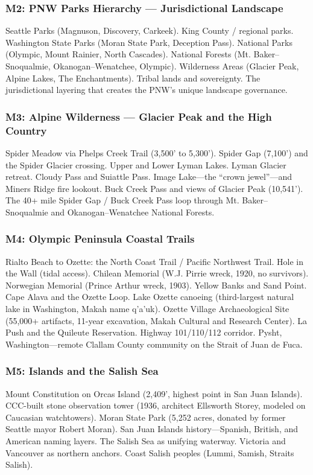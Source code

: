 \documentclass[11pt,letterpaper]{article}
\begin{document}
\subsubsection{M2: PNW Parks Hierarchy — Jurisdictional Landscape}
Seattle Parks (Magnuson, Discovery, Carkeek). King County / regional parks. Washington State Parks (Moran State Park, Deception Pass). National Parks (Olympic, Mount Rainier, North Cascades). National Forests (Mt. Baker--Snoqualmie, Okanogan--Wenatchee, Olympic). Wilderness Areas (Glacier Peak, Alpine Lakes, The Enchantments). Tribal lands and sovereignty. The jurisdictional layering that creates the PNW's unique landscape governance.

\subsubsection{M3: Alpine Wilderness — Glacier Peak and the High Country}
Spider Meadow via Phelps Creek Trail (3,500' to 5,300'). Spider Gap (7,100') and the Spider Glacier crossing. Upper and Lower Lyman Lakes. Lyman Glacier retreat. Cloudy Pass and Suiattle Pass. Image Lake---the ``crown jewel''---and Miners Ridge fire lookout. Buck Creek Pass and views of Glacier Peak (10,541'). The 40+ mile Spider Gap / Buck Creek Pass loop through Mt. Baker--Snoqualmie and Okanogan--Wenatchee National Forests.

\subsubsection{M4: Olympic Peninsula Coastal Trails}
Rialto Beach to Ozette: the North Coast Trail / Pacific Northwest Trail. Hole in the Wall (tidal access). Chilean Memorial (W.J. Pirrie wreck, 1920, no survivors). Norwegian Memorial (Prince Arthur wreck, 1903). Yellow Banks and Sand Point. Cape Alava and the Ozette Loop. Lake Ozette canoeing (third-largest natural lake in Washington, Makah name q'a'uk). Ozette Village Archaeological Site (55,000+ artifacts, 11-year excavation, Makah Cultural and Research Center). La Push and the Quileute Reservation. Highway 101/110/112 corridor. Pysht, Washington---remote Clallam County community on the Strait of Juan de Fuca.

\subsubsection{M5: Islands and the Salish Sea}
Mount Constitution on Orcas Island (2,409', highest point in San Juan Islands). CCC-built stone observation tower (1936, architect Ellsworth Storey, modeled on Caucasian watchtowers). Moran State Park (5,252 acres, donated by former Seattle mayor Robert Moran). San Juan Islands history---Spanish, British, and American naming layers. The Salish Sea as unifying waterway. Victoria and Vancouver as northern anchors. Coast Salish peoples (Lummi, Samish, Straits Salish).
\end{document}
